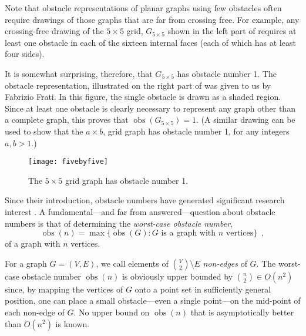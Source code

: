 \documentclass{patmorin}
\DeclareMathOperator{\obs}{obs}
\begin{document}
Note that obstacle representations of planar graphs using few obstacles
often require drawings of those graphs that are far from crossing free.
For example, any crossing-free drawing of the $5\times 5$ grid, $G_{5\times 5}$
shown in the left part of  requires at least one
obstacle in each of the sixteen internal faces (each of which has at
least four sides).

It is somewhat surprising, therefore, that $G_{5\times 5}$ has obstacle
number 1.  The obstacle representation, illustrated on the right part of
 was given to us by Fabrizio Frati. In this figure, the
single obstacle is drawn as a shaded region. Since at least one obstacle
is clearly necessary to represent any graph other than a complete graph,
this proves that $\obs(G_{5\times 5}) = 1$.  (A similar drawing can be
used to show that the $a\times b$, grid graph has obstacle number 1,
for any integers $a,b>1$.)

\begin{figure}[hbpt]
  \begin{center}
    \texttt{[image: fivebyfive]}
  \end{center}  
  \caption{The $5\times 5$ grid graph has obstacle number 1.}
\end{figure}

Since their introduction, obstacle numbers have generated significant
research interest 
\cite{%
   fulek.saeedi:convex,%
   johnson.sarioz:computing,%
   mukkamala.pach.ea:lower,%
   mukkamala.pach.ea:graphs,%
   pach.sarioz:small,%
   pach.sarioz:on,%
   sarioz:approximating%
}.
A fundamental---and far from answered---question about obstacle numbers
is that of determining the \emph{worst-case obstacle number},
\[
    \obs(n) = \max \{\obs(G) :\mbox{$G$ is a graph with $n$ vertices}\}
    \enspace ,
\] 
of a graph with $n$ vertices.

For a graph $G=(V,E)$, we call elements of $\binom{V}{2}\setminus E$
\emph{non-edges} of $G$.  The worst-case obstacle number $\obs(n)$ is
obviously upper bounded by $\binom{n}{2}\in O(n^2)$ since, by mapping
the vertices of $G$ onto a point set in sufficiently general position,
one can place a small obstacle---even a single point---on the mid-point
of each non-edge of $G$.  No upper bound on $\obs(n)$ that is asymptotically
better than $O(n^2)$ is known.
\end{document}
